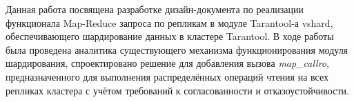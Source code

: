 \abstract

Данная работа посвящена разработке дизайн-документа по реализации функционала
Map-Reduce запроса по репликам в модуле Tarantool-а vshard, обеспечивающего
шардирование данных в кластере Tarantool. В ходе работы была проведена
аналитика существующего механизма функционирования модуля шардирования,
спроектировано решение для добавления вызова \textit{map_callro},
предназначенного для выполнения распределённых операций чтения на всех репликах
кластера с учётом требований к согласованности и отказоустойчивости.
